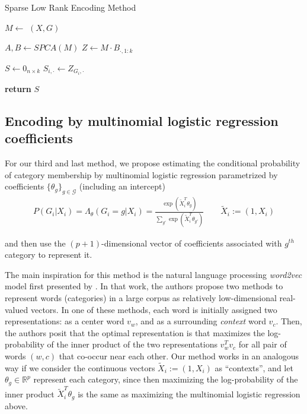 \documentclass{article}
\theoremstyle{plain}
\theoremstyle{definition}
\theoremstyle{remark}
\begin{document}
\begin{algorithm}
\caption{Sparse Low Rank Encoding Method}\label{alg:sparselowrankmethod}
\begin{algorithmic}[1]
\State $M \gets$ $(X, G)$

\State $A, B \gets SPCA(M)$
\State $Z \gets M \cdot B_{\cdot,1:k}$

\State $S \gets 0_{n \times k}$
\State $S_{i,\cdot} \gets Z_{G_i,\cdot}$
\EndFor

\State \textbf{return} $S$
\EndProcedure
\end{algorithmic}
\end{algorithm}



\subsection{Encoding by multinomial logistic regression coefficients}
\label{subsec:mnl}

For our third and last method, we propose estimating the conditional probability of category membership by multinomial logistic regression parametrized by coefficients $\{\theta_{g} \}_{g \in \mathcal{G}}$ (including an intercept)
\begin{align}
P(G_{i}|X_{i}) = \Lambda_{\theta}(G_{i}=g | X_{i}) =  \frac{\exp(\tilde{X}_{i}^{T} \theta_{g})}{\sum_{g'}\exp(\tilde{X}_{i}^{T}\theta_{g'})} \qquad \tilde{X}_{i} := (1, X_{i})
\label{eq:mnl}
\end{align}

\noindent and then use the $(p+1)$-dimensional vector of coefficients associated with $g^{th}$ category to represent it.

The main inspiration for this method is the natural language processing \emph{word2vec} model first presented by \cite{mikolov2013efficient}. In that work, the authors propose two methods to represent words (categories) in a large corpus as relatively low-dimensional real-valued vectors. In one of these methods, each word is initially assigned two representations: as a center word $v_{w}$, and as a surrounding \emph{context} word $v_{c}$. Then, the authors posit that the optimal representation is that maximizes the log-probability of the inner product of the two representations $v_{w}^{T}v_{c}$ for all pair of words $(w, c)$ that co-occur near each other. Our method works in an analogous way if we consider the continuous vectors $\tilde{X}_{i} := (1, X_{i})$ as ``contexts'', and let $\theta_{g} \in \mathbb{R}^{p}$ represent each category, since then maximizing the log-probability of the inner product $\tilde{X}_{i}^{T}\theta_{g}$ is the same as maximizing the multinomial logistic regression above.
\end{document}
